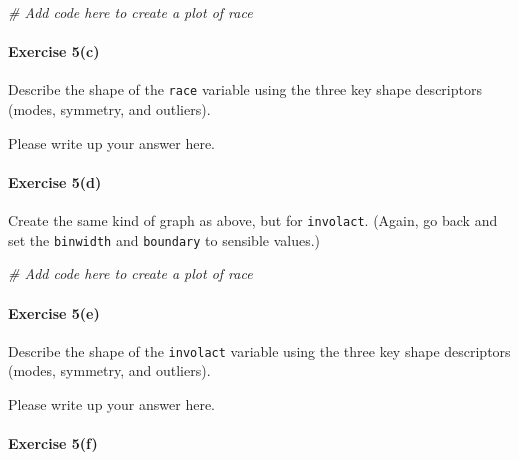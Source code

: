 \documentclass[
]{book}
\newenvironment{Shaded}{\begin{snugshade}}{\end{snugshade}}
\newcommand{\CommentTok}[1]{\textcolor[rgb]{0.56,0.35,0.01}{\textit{#1}}}
\begin{document}
\begin{Shaded}
\begin{Highlighting}[]
\CommentTok{\# Add code here to create a plot of race}
\end{Highlighting}
\end{Shaded}

\hypertarget{exercise-5c}{%
\paragraph*{Exercise 5(c)}\label{exercise-5c}}

Describe the shape of the \texttt{race} variable using the three key shape descriptors (modes, symmetry, and outliers).

Please write up your answer here.

\hypertarget{exercise-5d}{%
\paragraph*{Exercise 5(d)}\label{exercise-5d}}

Create the same kind of graph as above, but for \texttt{involact}. (Again, go back and set the \texttt{binwidth} and \texttt{boundary} to sensible values.)

\begin{Shaded}
\begin{Highlighting}[]
\CommentTok{\# Add code here to create a plot of race}
\end{Highlighting}
\end{Shaded}

\hypertarget{exercise-5e}{%
\paragraph*{Exercise 5(e)}\label{exercise-5e}}

Describe the shape of the \texttt{involact} variable using the three key shape descriptors (modes, symmetry, and outliers).

Please write up your answer here.

\hypertarget{exercise-5f}{%
\paragraph*{Exercise 5(f)}\label{exercise-5f}}
\end{document}
